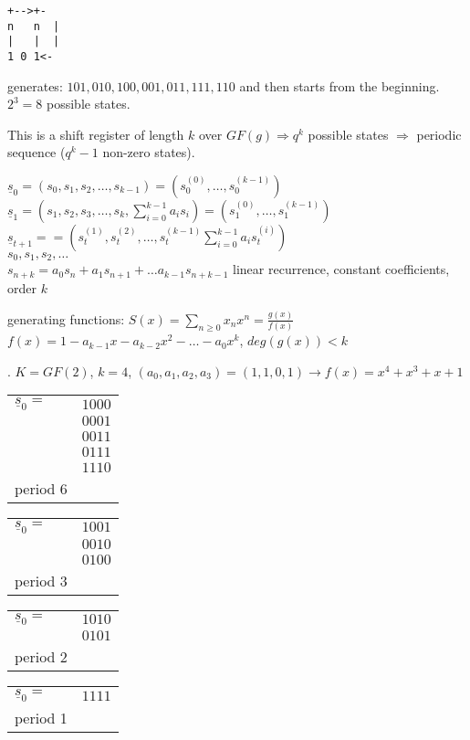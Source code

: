 
\begin{verbatim}
+-->+-
n   n  |
|   |  |
1 0 1<-
\end{verbatim}

generates: $101,010,100,001,011,111,110$ and then starts from the beginning. $2^3=8$ possible states.


This is a shift register of length $k$ over $GF(g) \Rightarrow q^k$ possible states $\Rightarrow$ periodic sequence ($q^k -1$ non-zero states).

$\underline{s}_0 = (s_0,s_1,s_2, \ldots, s_{k-1}) = (s_0^{(0)}, \ldots, s_0^{(k-1)})$\\
$\underline{s}_1 = (s_1,s_2,s_3, \ldots, s_{k}, \sum_{i=0}^{k-1}a_is_i) = (s_1^{(0)}, \ldots, s_1^{(k-1)})$\\
$\underline{s}_{t+1} =  = (s_t^{(1)}, s_t^{(2)}, \ldots, s_t^{(k-1)} \sum_{i=0}^{k-1}a_is_t^{(i)})$\\

$s_0,s_1,s_2,\ldots$\\
$s_{n+k} = a_0s_n + a_1 s_{n+1} + \ldots a_{k-1}s_{n+k-1}$ linear recurrence, constant coefficients, order $k$

generating functions: $S(x) = \sum_{n\geq 0}x_nx^n = \frac{g(x)}{f(x)}$\\
$f(x) = 1 -a_{k-1}x - a_{k-2}x^2 - \ldots -a_0 x^k$, $deg(g(x)) <k$

\Example.
$K=GF(2)$, $k=4$, $(a_0,a_1,a_2,a_3) = (1,1,0,1) \to f(x) = x^4 +x^3+x+1$

\begin{tabular}{ll}
  $\underline{s}_0 =$ & $1000$\\
                      & $0001$\\
                      & $0011$\\
                      & $0111$\\
                      & $1110$\\
  period 6
\end{tabular}
\begin{tabular}{ll}
  $\underline{s}_0 =$ & $1001$\\
                      & $0010$\\
                      & $0100$\\
  period 3
\end{tabular}
\begin{tabular}{ll}
  $\underline{s}_0 =$ & $1010$\\
                      & $0101$\\
  period 2
\end{tabular}
\begin{tabular}{ll}
  $\underline{s}_0 =$ & $1111$\\
  period 1
\end{tabular}

